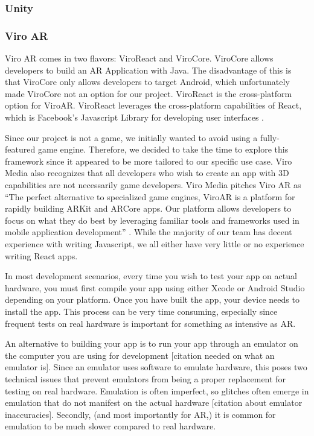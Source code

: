 \documentclass[a4paper, 10pt, american, titlepage]{article}
\begin{document}
\subsubsection{Unity}
\label{sec:unity}

\subsubsection{Viro AR}
\label{sec:viroAR}

Viro AR comes in two flavors: ViroReact and ViroCore. ViroCore allows
developers to build an AR Application with Java. The disadvantage of this is
that ViroCore only allows developers to target Android, which unfortunately
made ViroCore not an option for our project. ViroReact is the cross-platform
option for ViroAR. ViroReact leverages the cross-platform capabilities of
React, which is Facebook's Javascript Library for developing user interfaces
\autocite{facebook2019}.

Since our project is not a game, we initially wanted to avoid using a
fully-featured game engine. Therefore, we decided to take the time to explore
this framework since it appeared to be more tailored to our specific use case.
Viro Media also recognizes that all developers who wish to create an app with
3D capabilities are not necessarily game developers. Viro Media pitches Viro
AR as ``The perfect alternative to specialized game engines, ViroAR is a
platform for rapidly building ARKit and ARCore apps. Our platform allows
developers to focus on what they do best by leveraging familiar tools and
frameworks used in mobile application development'' \autocite{viro2019}.
While the majority of our team has decent experience with writing Javascript,
we all either have very little or no experience writing React apps.

In most development scenarios, every time you wish to test your app on actual
hardware, you must first compile your app using either Xcode or Android Studio
depending on your platform. Once you have built the app, your device needs to
install the app. This process can be very time consuming, especially since
frequent tests on real hardware is important for something as intensive as
AR.

An alternative to building your app is to run your app through an emulator on
the computer you are using for development [citation needed on what an
emulator is]. Since an emulator uses software to emulate hardware, this poses
two technical issues that prevent emulators from being a proper replacement
for testing on real hardware.  Emulation is often imperfect, so glitches often
emerge in emulation that do not manifest on the actual hardware [citation
about emulator inaccuracies]. Secondly, (and most importantly for AR,)
it is common for emulation to be much slower compared to real hardware.
\end{document}
